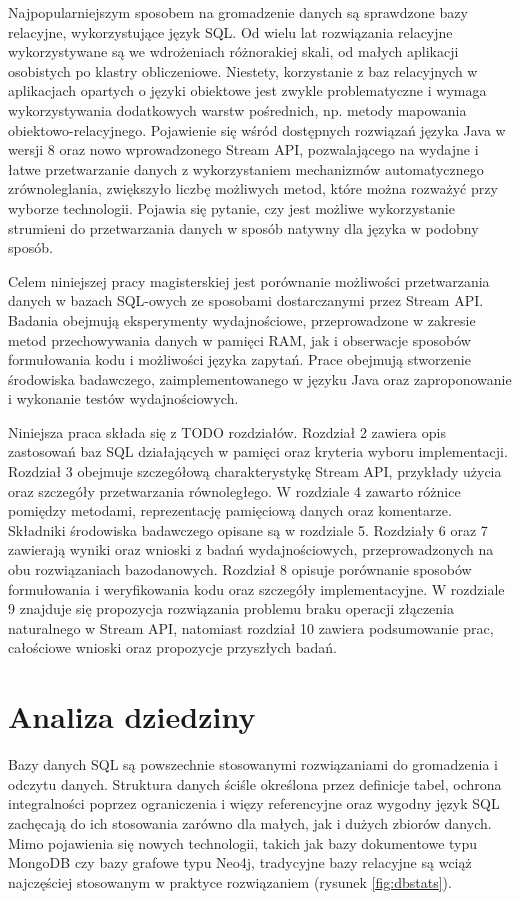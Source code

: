 \documentclass[12pt,twoside,openright]{extarticle}
\let\oldsection\section%
\renewcommand{\section}{\cleardoublepage\oldsection}%
\begin{document}
    Najpopularniejszym sposobem na gromadzenie danych są sprawdzone bazy relacyjne, wykorzystujące język SQL. Od wielu lat rozwiązania relacyjne wykorzystywane są we wdrożeniach różnorakiej skali, od małych aplikacji osobistych po klastry obliczeniowe. Niestety, korzystanie z baz relacyjnych w aplikacjach opartych o języki obiektowe jest zwykle problematyczne i wymaga wykorzystywania dodatkowych warstw pośrednich, np. metody mapowania obiektowo-relacyjnego. Pojawienie się wśród dostępnych rozwiązań języka Java w wersji 8 oraz nowo wprowadzonego Stream API, pozwalającego na wydajne i łatwe przetwarzanie danych z wykorzystaniem mechanizmów automatycznego zrównoleglania, zwiększyło liczbę możliwych metod, które można rozważyć przy wyborze technologii. Pojawia się pytanie, czy jest możliwe wykorzystanie strumieni do przetwarzania danych w sposób natywny dla języka w podobny sposób.

	Celem niniejszej pracy magisterskiej jest porównanie możliwości przetwarzania danych w bazach SQL-owych ze sposobami dostarczanymi przez Stream API. Badania obejmują eksperymenty wydajnościowe, przeprowadzone w zakresie metod przechowywania danych w pamięci RAM, jak i obserwacje sposobów formułowania kodu i możliwości języka zapytań. Prace obejmują stworzenie środowiska badawczego, zaimplementowanego w języku Java oraz zaproponowanie i wykonanie testów wydajnościowych.

    Niniejsza praca składa się z TODO rozdziałów. Rozdział 2 zawiera opis zastosowań baz SQL działających w pamięci oraz kryteria wyboru implementacji. Rozdział 3 obejmuje szczegółową charakterystykę Stream API, przykłady użycia oraz szczegóły przetwarzania równoległego. W rozdziale 4 zawarto różnice pomiędzy metodami, reprezentację pamięciową danych oraz komentarze. Składniki środowiska badawczego opisane są w rozdziale 5. Rozdziały 6 oraz 7 zawierają wyniki oraz wnioski z badań wydajnościowych, przeprowadzonych na obu rozwiązaniach bazodanowych. Rozdział 8 opisuje porównanie sposobów formułowania i weryfikowania kodu oraz szczegóły implementacyjne. W rozdziale 9 znajduje się propozycja rozwiązania problemu braku operacji złączenia naturalnego w Stream API, natomiast rozdział 10 zawiera podsumowanie prac, całościowe wnioski oraz propozycje przyszłych badań.


\section{Analiza dziedziny}

    Bazy danych SQL są powszechnie stosowanymi rozwiązaniami do gromadzenia i odczytu danych. Struktura danych ściśle określona przez definicje tabel, ochrona integralności poprzez ograniczenia i więzy referencyjne oraz wygodny język SQL zachęcają do ich stosowania zarówno dla małych, jak i dużych zbiorów danych. Mimo pojawienia się nowych technologii, takich jak bazy dokumentowe typu MongoDB czy bazy grafowe typu Neo4j, tradycyjne bazy relacyjne są wciąż najczęściej stosowanym w praktyce rozwiązaniem (rysunek \ref{fig:dbstats}).
\end{document}
